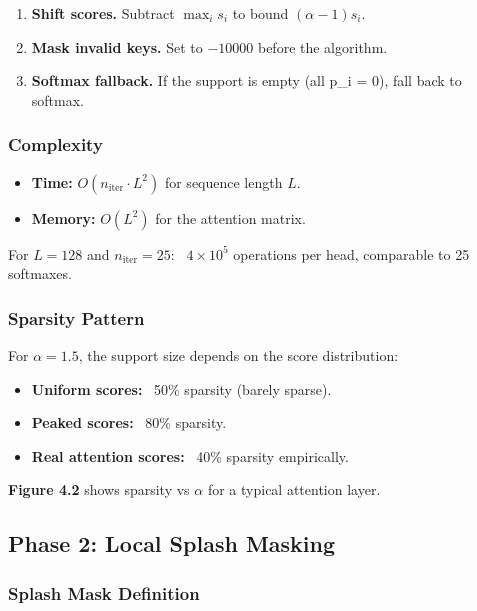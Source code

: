 \begin{enumerate}
\item \textbf{Shift scores.} Subtract $\max_i s_i$ to bound $(\alpha - 1) s_i$.
\item \textbf{Mask invalid keys.} Set to $-10000$ before the algorithm.
\item \textbf{Softmax fallback.} If the support is empty (all p\_i = 0), fall back
  to softmax.

\end{enumerate}
\subsubsection{Complexity}

\begin{itemize}
\item \textbf{Time:} $O(n_\text{iter} \cdot L^2)$ for sequence length $L$.
\item \textbf{Memory:} $O(L^2)$ for the attention matrix.

\end{itemize}
For $L = 128$ and $n_\text{iter} = 25$: ~$4 \times 10^5$ operations per head, 
comparable to 25 softmaxes.

\subsubsection{Sparsity Pattern}

For $\alpha = 1.5$, the support size depends on the score distribution:

\begin{itemize}
\item \textbf{Uniform scores:} ~50\% sparsity (barely sparse).
\item \textbf{Peaked scores:} ~80\% sparsity.
\item \textbf{Real attention scores:} ~40\% sparsity empirically.

\end{itemize}
\textbf{Figure 4.2} shows sparsity vs $\alpha$ for a typical attention layer.

\subsection{Phase 2: Local Splash Masking}

\subsubsection{Splash Mask Definition}

